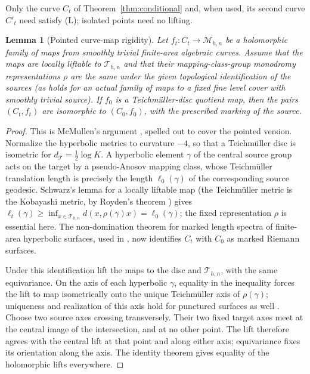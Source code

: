 \documentclass[12pt]{article}
\newcommand{\M}{\mathcal M}
\newcommand{\T}{\mathcal T}
\newtheorem{lemma}[theorem]{Lemma}
\theoremstyle{remark}
\begin{document}
\noindent Only the curve \(C_t\) of Theorem~\ref{thm:conditional}
and, when used, its second curve \(C'_t\) need satisfy (L); isolated
points need no lifting.

\begin{lemma}[Pointed curve-map rigidity]\label{lem:pointed}
Let \(f_t:C_t\to\M_{h,n}\) be a holomorphic family of maps from
smoothly trivial finite-area algebraic curves. Assume that the maps
are locally liftable to \(\T_{h,n}\) and that their
mapping-class-group monodromy representations \(\rho\) are the same
under the given topological identification of the sources (as holds
for an actual family of maps to a fixed fine level
cover with smoothly trivial source). If \(f_0\) is a
Teichm\"uller-disc quotient map, then the pairs \((C_t,f_t)\) are
isomorphic to \((C_0,f_0)\), with the prescribed marking of the source.
\end{lemma}

\begin{proof}
This is McMullen's argument \cite{McMullen}, spelled out to
cover the pointed version. Normalize the hyperbolic metrics
to curvature \(-4\), so that a Teichm\"uller disc is isometric
for \(d_{\T}=\frac12\log K\). A hyperbolic element \(\gamma\) of
the central source group acts on the target by a pseudo-Anosov
mapping class, whose Teichm\"uller translation length is precisely
the length \(\ell_0(\gamma)\) of the corresponding source geodesic.
Schwarz's lemma for a locally liftable map (the Teichm\"uller
metric is the Kobayashi metric, by Royden's theorem
\cite[Section 7(A)]{BersFinite}) gives
\(\ell_t(\gamma)\geq\inf_{x\in\T_{h,n}}d(x,\rho(\gamma)x)
=\ell_0(\gamma)\); the fixed representation \(\rho\) is essential
here. The non-domination theorem for marked length spectra of
finite-area hyperbolic surfaces, used in \cite{McMullen}, now
identifies \(C_t\) with \(C_0\) as marked Riemann surfaces.

Under this identification lift the maps to the disc and
\(\T_{h,n}\), with the same equivariance. On the axis of each
hyperbolic \(\gamma\), equality in the inequality forces
the lift to map isometrically onto the unique Teichm\"uller axis
of \(\rho(\gamma)\); uniqueness and realization of this axis hold
for punctured surfaces as well
\cite[Theorem 2.1 and its following remark]{Tanigawa}.
Choose two source axes crossing transversely. Their two fixed
target axes meet at the central image of the intersection, and
at no other point. The lift therefore agrees with the central
lift at that point and along either axis; equivariance fixes its
orientation along the axis. The identity theorem gives equality
of the holomorphic lifts everywhere.
\end{proof}
\end{document}
